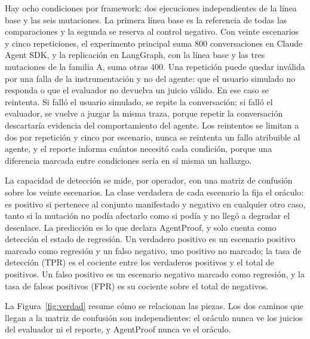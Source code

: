 \par
Hay ocho condiciones por framework: dos ejecuciones independientes de la línea base y las seis mutaciones. La primera línea base es la referencia de todas las comparaciones y la segunda se reserva al control negativo. Con veinte escenarios y cinco repeticiones, el experimento principal suma 800 conversaciones en Claude Agent SDK, y la replicación en LangGraph, con la línea base y las tres mutaciones de la familia A, suma otras 400. Una repetición puede quedar inválida por una falla de la instrumentación y no del agente: que el usuario simulado no responda o que el evaluador no devuelva un juicio válido. En ese caso se reintenta. Si falló el usuario simulado, se repite la conversación; si falló el evaluador, se vuelve a juzgar la misma traza, porque repetir la conversación descartaría evidencia del comportamiento del agente. Los reintentos se limitan a dos por repetición y cinco por escenario, nunca se reintenta un fallo atribuible al agente, y el reporte informa cuántos necesitó cada condición, porque una diferencia marcada entre condiciones sería en sí misma un hallazgo.
\par

La capacidad de detección se mide, por operador, con una matriz de confusión sobre los veinte escenarios. La clase verdadera de cada escenario la fija el oráculo: es positivo si pertenece al conjunto manifestado y negativo en cualquier otro caso, tanto si la mutación no podía afectarlo como si podía y no llegó a degradar el desenlace. La predicción es lo que declara AgentProof, y solo cuenta como detección el estado de regresión. Un verdadero positivo es un escenario positivo marcado como regresión y un falso negativo, uno positivo no marcado; la tasa de detección (TPR) es el cociente entre los verdaderos positivos y el total de positivos. Un falso positivo es un escenario negativo marcado como regresión, y la tasa de falsos positivos (FPR) es su cociente sobre el total de negativos.
\par
La Figura~\ref{fig:verdad} resume cómo se relacionan las piezas. Los dos caminos que llegan a la matriz de confusión son independientes: el oráculo nunca ve los juicios del evaluador ni el reporte, y AgentProof nunca ve el oráculo.
\par

